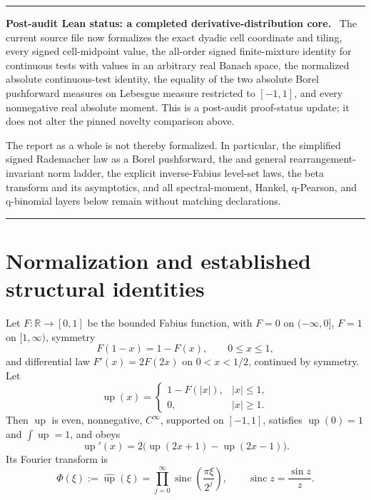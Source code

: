 \documentclass[11pt,oneside]{article}
\numberwithin{equation}{section}
\theoremstyle{plain}
\theoremstyle{definition}
\theoremstyle{remark}
\newcommand{\R}{\mathbb R}
\newcommand{\Up}{\operatorname{up}}
\newcommand{\sinc}{\operatorname{sinc}}
\newenvironment{statusbox}[1]{%
  \par\medskip\noindent\begin{minipage}{\textwidth}%
  \color{DeepBlue}\hrule\vspace{5pt}%
  \color{black}\textbf{\color{DeepBlue}#1.}\ }{%
  \par\vspace{5pt}\color{DeepBlue}\hrule
  \end{minipage}\par\medskip}
\begin{document}
\begin{statusbox}{Post-audit Lean status: a completed derivative-distribution core}
The current source file
now formalizes the exact dyadic cell coordinate and tiling, every signed cell-midpoint value,
the all-order signed finite-mixture identity for continuous tests with values in an arbitrary
real Banach space, the normalized absolute continuous-test identity, the equality of the two
absolute Borel pushforward measures on Lebesgue measure restricted to \([-1,1]\), and every
nonnegative real absolute moment.  This is a post-audit proof-status update; it does not alter
the pinned novelty comparison above.

The report as a whole is not thereby formalized.  In particular, the simplified signed
Rademacher law as a Borel pushforward, the  and general
rearrangement-invariant norm ladder, the explicit inverse-Fabius level-set laws, the beta
transform and its asymptotics, and all spectral-moment, Hankel, q-Pearson, and
q-binomial layers below remain without matching declarations.
\end{statusbox}

\section{Normalization and established structural identities}
\label{sec:baseline}

Let $F:\R\to[0,1]$ be the bounded Fabius function, with $F=0$ on $(-\infty,0]$,
$F=1$ on $[1,\infty)$, symmetry
\begin{equation}
 F(1-x)=1-F(x),\qquad 0\leq x\leq1,
 \label{eq:F-symmetry}
\end{equation}
and differential law $F'(x)=2F(2x)$ on $0<x<1/2$, continued by symmetry.  Let
\begin{equation}
 \Up(x)=
 \begin{cases}
  1-F(|x|),&|x|\leq1,\\
  0,&|x|\geq1.
 \end{cases}
 \label{eq:up-from-F}
\end{equation}
Then $\Up$ is even, nonnegative, $C^\infty$, supported on $[-1,1]$, satisfies
$\Up(0)=1$ and $\int\Up=1$, and obeys
\begin{equation}
 \Up'(x)=2\bigl(\Up(2x+1)-\Up(2x-1)\bigr).
 \label{eq:up-differential}
\end{equation}
Its Fourier transform is
\begin{equation}
 \Phi(\xi):=\widehat{\Up}(\xi)
 =\prod_{j=0}^{\infty}\sinc\!\left(\frac{\pi\xi}{2^j}\right),
 \qquad \sinc z=\frac{\sin z}{z}.
 \label{eq:phi-product}
\end{equation}
\end{document}
